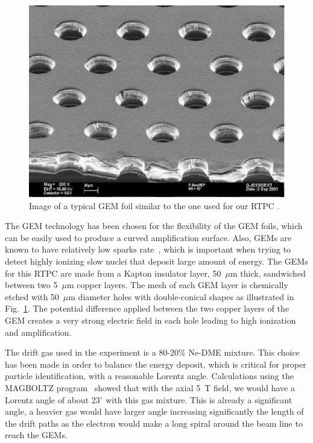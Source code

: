 \documentclass[preprint,5p]{elsarticle}
\begin{document}
\begin{figure}[tbp]
\centering
\includegraphics[scale=0.70]{fig/GEM_photo.jpg}
\caption{Image of a typical GEM foil similar to the one used for our RTPC 
\cite{GEM_ref_pic}.} 
   
   
   \label{fig:GEMs}
\end{figure}

The GEM technology has been chosen for the flexibility of the GEM foils,
which can be easily used to produce a curved amplification surface. Also, 
GEMs are known to have relatively low sparks rate~\cite{GEM_ref}, which 
is important when trying to detect 
highly ionizing slow nuclei that deposit large amount of energy. The GEMs for 
this RTPC are made from a Kapton insulator layer, 50~$\mu$m 
thick, sandwiched between two 5~$\mu$m copper layers. The mesh of each GEM 
layer is chemically etched with 50~$\mu$m diameter holes with double-conical 
shapes as illustrated in Fig.~\ref{fig:GEMs}. The potential difference 
applied between the two copper layers of the GEM creates a very strong 
electric field in each hole leading to high ionization and amplification. 

The drift gas used in the experiment is a 80-20\% Ne-DME mixture. This choice 
has been made in order to balance the energy deposit, which is critical
for proper particle identification, with a reasonable
Lorentz angle. Calculations using the MAGBOLTZ program~\cite{MAGBOLTZ} 
showed that with the axial 5~T field, we would have a Lorentz angle of 
about 23$^\circ$ with this gas mixture. This is already a significant angle,
a heavier gas would have larger angle increasing significantly
the length of the drift paths as the electron would 
make a long spiral around the beam line to reach the GEMs. 
\end{document}
